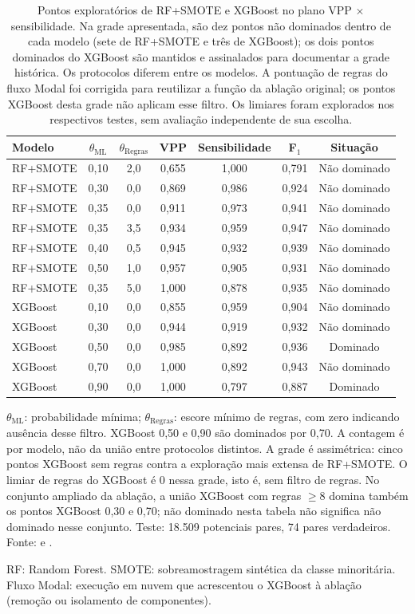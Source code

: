 \begin{table}[htbp]
\centering
\caption{Pontos exploratórios de RF+SMOTE e XGBoost no plano VPP $\times$ sensibilidade. Na grade apresentada, são dez pontos não dominados dentro de cada modelo (sete de RF+SMOTE e três de XGBoost); os dois pontos dominados do XGBoost são mantidos e assinalados para documentar a grade histórica. Os protocolos diferem entre os modelos. A pontuação de regras do fluxo Modal foi corrigida para reutilizar a função da ablação original; os pontos XGBoost desta grade não aplicam esse filtro. Os limiares foram explorados nos respectivos testes, sem avaliação independente de sua escolha.}
\label{tab:pareto-frontier}
\small
\begin{tabular}{lcccccc}
\toprule
Modelo & $\theta_{\text{ML}}$ & $\theta_{\text{Regras}}$ & VPP & Sensibilidade & F$_1$ & Situação \\
\midrule
RF+SMOTE & 0,10 & 2,0 & 0,655 & 1,000 & 0,791 & Não dominado \\
RF+SMOTE & 0,30 & 0,0 & 0,869 & 0,986 & 0,924 & Não dominado \\
RF+SMOTE & 0,35 & 0,0 & 0,911 & 0,973 & 0,941 & Não dominado \\
RF+SMOTE & 0,35 & 3,5 & 0,934 & 0,959 & 0,947 & Não dominado \\
RF+SMOTE & 0,40 & 0,5 & 0,945 & 0,932 & 0,939 & Não dominado \\
RF+SMOTE & 0,50 & 1,0 & 0,957 & 0,905 & 0,931 & Não dominado \\
RF+SMOTE & 0,35 & 5,0 & 1,000 & 0,878 & 0,935 & Não dominado \\
XGBoost & 0,10 & 0,0 & 0,855 & 0,959 & 0,904 & Não dominado \\
XGBoost & 0,30 & 0,0 & 0,944 & 0,919 & 0,932 & Não dominado \\
XGBoost & 0,50 & 0,0 & 0,985 & 0,892 & 0,936 & Dominado \\
XGBoost & 0,70 & 0,0 & 1,000 & 0,892 & 0,943 & Não dominado \\
XGBoost & 0,90 & 0,0 & 1,000 & 0,797 & 0,887 & Dominado \\
\bottomrule
\end{tabular}
\par\footnotesize $\theta_{\text{ML}}$: probabilidade mínima; $\theta_{\text{Regras}}$: escore mínimo de regras, com zero indicando ausência desse filtro. XGBoost 0,50 e 0,90 são dominados por 0,70. A contagem é por modelo, não da união entre protocolos distintos. A grade é assimétrica: cinco pontos XGBoost sem regras contra a exploração mais extensa de RF+SMOTE. O limiar de regras do XGBoost é 0 nessa grade, isto é, sem filtro de regras. No conjunto ampliado da ablação, a união XGBoost com regras $\geq8$ domina também os pontos XGBoost 0,30 e 0,70; não dominado nesta tabela não significa não dominado nesse conjunto. Teste: 18.509 potenciais pares, 74 pares verdadeiros. Fonte:  e .
\par\footnotesize RF: Random Forest. SMOTE: sobreamostragem sintética da classe minoritária. Fluxo Modal: execução em nuvem que acrescentou o XGBoost à ablação (remoção ou isolamento de componentes).
\end{table}
